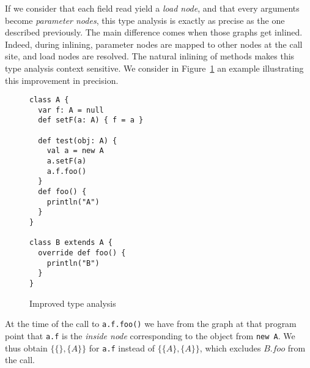 If we consider that each field read yield a \emph{load node}, and that every
arguments become \emph{parameter nodes}, this type analysis is exactly as
precise as the one described previously. The main difference comes when those
graphs get inlined. Indeed, during inlining, parameter nodes are mapped to
other nodes at the call site, and load nodes are resolved. The natural inlining
of methods makes this type analysis context sensitive. We consider in
Figure~\ref{fig:pt:precise} an example illustrating this improvement in precision.

\begin{figure}[h]
    \centering
\begin{lstlisting}
class A {
  var f: A = null
  def setF(a: A) { f = a }

  def test(obj: A) {
    val a = new A
    a.setF(a)
    a.f.foo()
  }
  def foo() {
    println("A")
  }
}

class B extends A {
  override def foo() {
    println("B")
  }
}
\end{lstlisting}
    \caption{Improved type analysis}
    \label{fig:pt:precise}
\end{figure}

At the time of the call to \verb/a.f.foo()/ we have from the graph at that
program point that \verb/a.f/ is the \emph{inside node} corresponding to the
object from \verb/new A/. We thus obtain $\{ \{\}, \{A\} \}$ for \verb/a.f/ instead of
$\{ \{A\}, \{A\} \}$, which excludes $B.foo$ from the call.
